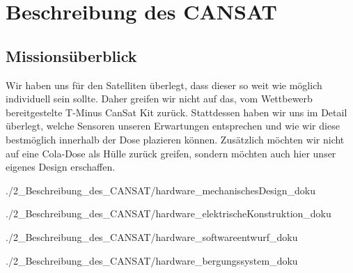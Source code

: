 \section{Beschreibung des CANSAT}


\subsection{Missionsüberblick}
Wir haben uns für den Satelliten überlegt, dass dieser so weit wie möglich individuell sein sollte. Daher greifen wir nicht auf das, vom Wettbewerb bereitgestelte T-Minus CanSat Kit zurück. Stattdessen haben wir uns im Detail überlegt, welche Sensoren unseren Erwartungen entsprechen und wie wir diese bestmöglich innerhalb der Dose plazieren können. Zusätzlich möchten wir nicht auf eine Cola-Dose als Hülle zurück greifen, sondern möchten auch hier unser eigenes Design erschaffen.


 {./2_Beschreibung_des_CANSAT/hardware_mechanischesDesign_doku}


 {./2_Beschreibung_des_CANSAT/hardware_elektrischeKonstruktion_doku}

 {./2_Beschreibung_des_CANSAT/hardware_softwareentwurf_doku}

 {./2_Beschreibung_des_CANSAT/hardware_bergungssystem_doku}



